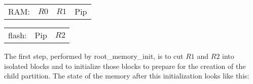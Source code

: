 \documentclass[10pt,a4paper,titlepage]{refart}
\begin{document}
\begin{center}
\begin{tabular}{l|c|c|c|}
    \cline{2-4}
    RAM:\hspace{0.5cm} & \hspace{0.5cm}$R0$\hspace{0.5cm} & \hspace{0.5cm}$R1$\hspace{0.5cm} & \hspace{0.3cm}Pip\hspace{0.3cm}\hspace{0.3cm}\\
    \cline{2-4}
\end{tabular}

\begin{tabular}{l|c|c|}
    \cline{2-3}
    flash:\hspace{0.64cm} & \hspace{0.4cm}Pip\hspace{0.4cm} & \hspace{1.35cm}$R2$\hspace{1.35cm}\hspace{1cm}\\
    \cline{2-3}
\end{tabular}
\end{center}

The first step, performed by root\_memory\_init, is to cut $R1$ and $R2$ into isolated blocks and to initialize those blocks to 
prepare for the creation of the child partition. %
The state of the memory after this initialization looks like this:
\end{document}
